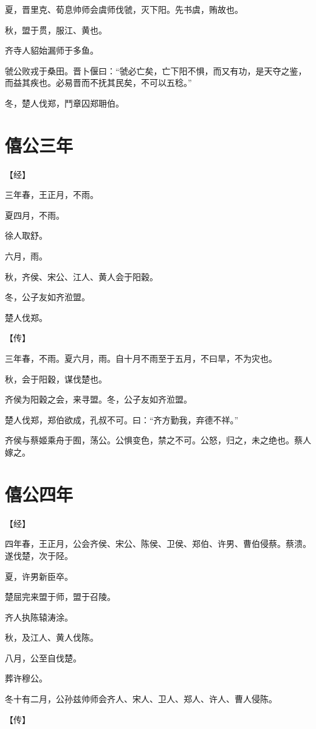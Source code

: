 \documentclass[a4paper,12pt,UTF8,twoside]{ctexbook}
\begin{document}
夏，晋里克、荀息帅师会虞师伐虢，灭下阳。先书虞，贿故也。

秋，盟于贯，服江、黄也。

齐寺人貂始漏师于多鱼。

虢公败戎于桑田。晋卜偃曰：“虢必亡矣，亡下阳不惧，而又有功，是天夺之鉴，而益其疾也。必易晋而不抚其民矣，不可以五稔。”

冬，楚人伐郑，鬥章囚郑耼伯。


\chapter{僖公三年}


【经】

三年春，王正月，不雨。

夏四月，不雨。

徐人取舒。

六月，雨。

秋，齐侯、宋公、江人、黄人会于阳穀。

冬，公子友如齐涖盟。

楚人伐郑。

【传】

三年春，不雨。夏六月，雨。自十月不雨至于五月，不曰旱，不为灾也。

秋，会于阳穀，谋伐楚也。

齐侯为阳穀之会，来寻盟。冬，公子友如齐涖盟。

楚人伐郑，郑伯欲成，孔叔不可。曰：“齐方勤我，弃德不祥。”

齐侯与蔡姬乘舟于囿，荡公。公惧变色，禁之不可。公怒，归之，未之绝也。蔡人嫁之。

\chapter{僖公四年}




【经】

四年春，王正月，公会齐侯、宋公、陈侯、卫侯、郑伯、许男、曹伯侵蔡。蔡溃。遂伐楚，次于陉。

夏，许男新臣卒。

楚屈完来盟于师，盟于召陵。

齐人执陈辕涛涂。

秋，及江人、黄人伐陈。

八月，公至自伐楚。

葬许穆公。

冬十有二月，公孙兹帅师会齐人、宋人、卫人、郑人、许人、曹人侵陈。

【传】
\end{document}
